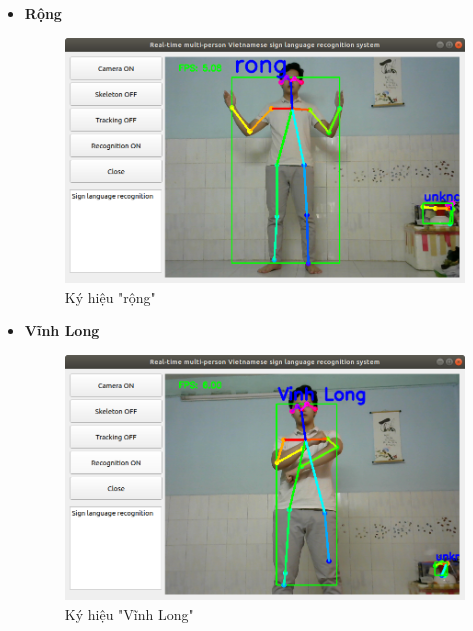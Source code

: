 \documentclass[12pt,a4paper,oneside]{book}
\numberwithin{equation}{chapter} %
\numberwithin{figure}{chapter} %
\numberwithin{table}{chapter} %
\begin{document}
\begin{itemize}
\item \textbf{Rộng}
\FloatBarrier
\begin{figure}[htp]
\begin{center}
\includegraphics[scale=0.4]{kq/rong.png}
\end{center}
\caption{Ký hiệu "rộng"}
\end{figure}
\FloatBarrier

\item \textbf{Vĩnh Long}
\FloatBarrier
\begin{figure}[htp]
\begin{center}
\includegraphics[scale=0.4]{kq/vinh_long.png}
\end{center}
\caption{Ký hiệu "Vĩnh Long"}
\end{figure}
\FloatBarrier

\end{itemize}
\thispagestyle{phuluc}
\newpage


\end{document}

